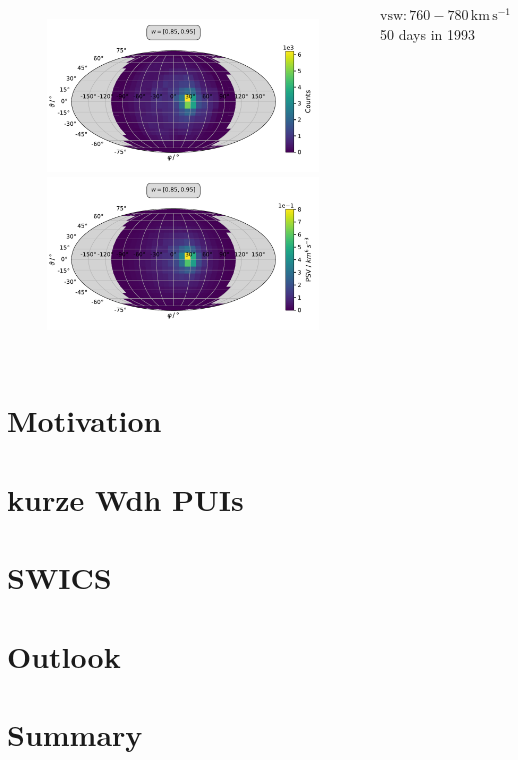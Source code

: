 \documentclass{beamer}
\begin{document}
%
%
%
\begin{frame}[plain]{}
\begin{columns}
	\column{7.5cm}
	\begin{figure}
			\includegraphics[scale=.4]{Pics/sky_counts.pdf}
		\includegraphics[scale=.4]{Pics/sky_norm.pdf}
		\end{figure}

	\column{2.5cm}
	\vspace{8cm}
	 {\tiny $\mathrm{vsw}:760 - 780 \, \mathrm{km\,s^{-1}}$ \\
		50 days in 1993}
	
	\end{columns}


\end{frame}



%
%
%
\section{Motivation}
\section{kurze Wdh PUIs}
\section{SWICS}

\section{Outlook}
\section{Summary}
%
%
%
\end{document}
